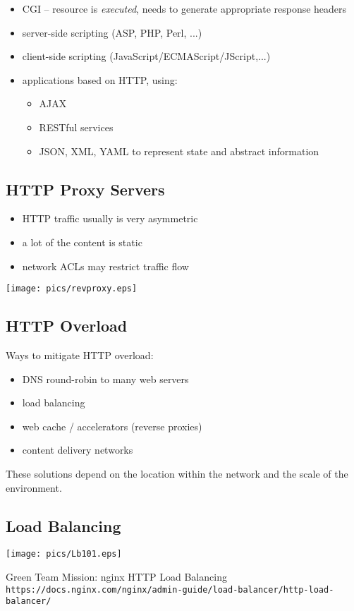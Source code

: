 \documentclass[xga]{xdvislides}
\begin{document}
\begin{itemize}
	\item CGI -- resource is {\em executed}, needs to generate
		appropriate response headers
	\item server-side scripting (ASP, PHP, Perl, ...)
	\item client-side scripting (JavaScript/ECMAScript/JScript,...)
	\item applications based on HTTP, using:
		\begin{itemize}
			\item AJAX
			\item RESTful services
			\item JSON, XML, YAML to represent state and
				abstract information
		\end{itemize}
\end{itemize}

\subsection{HTTP Proxy Servers}
\begin{itemize}
	\item HTTP traffic usually is very asymmetric
	\item a lot of the content is static
	\item network ACLs may restrict traffic flow
\end{itemize}
\vspace{.25in}
\begin{center}
	\texttt{[image: pics/revproxy.eps]}
\end{center}

\subsection{HTTP Overload}
Ways to mitigate HTTP overload:

\begin{itemize}
	\item DNS round-robin to many web servers
	\item load balancing
	\item web cache / accelerators (reverse proxies)
	\item content delivery networks
\end{itemize}

These solutions depend on the location within the network and the scale of
the environment.

\subsection{Load Balancing}
\begin{center}
	\texttt{[image: pics/Lb101.eps]}
\end{center}
Green Team Mission: nginx HTTP Load Balancing \\
\verb+https://docs.nginx.com/nginx/admin-guide/load-balancer/http-load-balancer/+
\end{document}

